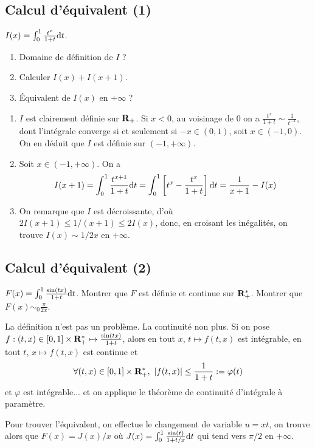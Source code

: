 \subsection{Calcul d'équivalent (1)}
\begin{exercice}
	$I(x)=\int_0^1\frac{t^x}{1+t}\mathrm{d} t$.
	\begin{enumerate}
		\item Domaine de définition de $I$ ?
		\item Calculer $I(x) + I(x + 1)$.
		\item Équivalent de $I(x)$ en $+\infty$ ?
	\end{enumerate}
\end{exercice}

\begin{correction}
	\begin{enumerate}
		\item $I$ est clairement définie sur $\operatorname{\mathbf{R}}_+$. 
		Si $x<0$, au voisinage de $0$ on a $\frac{t^x}{1+t}\sim\frac1{t^{-x}}$, dont l'intégrale converge si et seulement si $-x\in(0,1)$, soit $x\in(-1,0)$.
		On en déduit que $I$ est définie sur $(-1,+\infty)$.
		
		\item Soit $x\in(-1,+\infty)$.
		On a 
		\[
			I(x+1)=\int_0^1\frac{t^{x+1}}{1+t}\mathrm{d} t = \int_0^1\left[t^x-\frac{t^x}{1+t}\right]\mathrm{d} t=\frac1{x+1}-I(x)
		\]
		\item On remarque que $I$ est décroissante, d'où $2I(x+1)\leq1/(x+1)\leq2 I(x)$, donc, en croisant les inégalités, on trouve $I(x)\sim 1/2x$ en $+\infty$.
	\end{enumerate}
\end{correction}

\subsection{Calcul d'équivalent (2)}
\begin{exercice}
	$F(x) = \int_0^1\frac{\sin(tx)}{1+t}\mathrm{d} t$. Montrer que $F$ est définie et continue sur ${\mathbf R}_{+}^*$. Montrer que $F(x)\sim_0\frac\pi{2x}$.
\end{exercice}

\begin{correction}
	La définition n'est pas un problème. La continuité non plus. 
	Si on pose $f:(t,x)\in[0,1]\times{\mathbf R}_{+}^*\mapsto \frac{\sin(tx)}{1+t}$, alors en tout $x$, $t\mapsto f(t,x)$ est intégrable, en tout $t$, $x\mapsto f(t,x)$ est continue et 
	\[
		\forall (t,x)\in[0,1]\times{\mathbf R}_{+}^*,\ |f(t,x)|\leq\frac1{1+t}:=\varphi(t)
	\]
	et $\varphi$ est intégrable... et on applique le théorème de continuité d'intégrale à paramètre.

	Pour trouver l'équivalent, on effectue le changement de variable $u=xt$, on trouve alors que $F(x)=J(x)/x$ où $J(x)=\int_{0}^1\frac{\sin(t)}{1+t/x}\mathrm{d} t$ qui tend vers $\pi/2$ en $+\infty$.
\end{correction}


